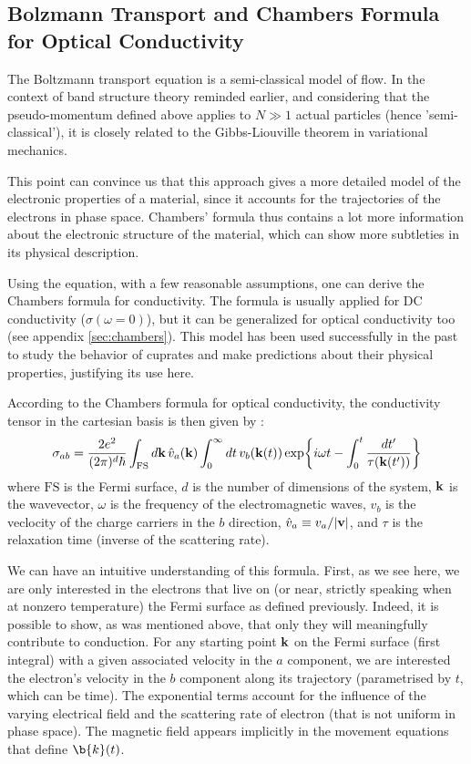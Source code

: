 \subsection{Bolzmann Transport and Chambers Formula for Optical Conductivity}
The Boltzmann transport equation is a semi-classical model of flow. 
In the context of band structure theory reminded earlier, 
and considering that the pseudo-momentum defined above applies to $N\gg 1$ actual particles (hence 'semi-classical'), 
it is closely related to the Gibbs-Liouville theorem in variational mechanics. 

This point can convince us that this approach gives a more detailed model of the electronic properties of a material, 
since it accounts for the trajectories of the electrons in phase space. 
Chambers' formula thus contains a lot more information about the electronic structure
of the material, 
which can show more subtleties in its physical description.

Using the equation, with a few reasonable assumptions, 
one can derive the Chambers formula for conductivity. 
The formula is usually applied for DC conductivity ($\sigma(\omega=0)$), 
but it can be generalized for optical conductivity too (see appendix \ref{sec:chambers}).
This model has been used successfully in the past to study the behavior of cuprates 
and make predictions about their physical properties\cite{grissonnanche2021}, 
justifying its use here.

According to the Chambers formula for optical conductivity, 
the conductivity tensor in the cartesian basis is then given by :
\begin{equation}
	\sigma_{ab} = \frac{2e^2}{(2\pi)^d\hbar}\int_{\mathrm{FS}}\dd{\vb{k}}\hat{v}_a(\vb{k})
        \int_0^{\infty}\dd{t}v_b(\vb{k}(t))\exp{i\omega t
        - \int_0^t \frac{\mathop{dt'}}{\tau(\vb{k}(t'))}}
\end{equation}
where $\mathrm{FS}$ is the Fermi surface, $d$ is the number of dimensions of the system, $\vb{k}$ is the
wavevector, $\omega$ is the frequency of the electromagnetic waves, $v_b$ is the veclocity of the
charge carriers in the $b$ direction, $\hat{v}_a\equiv v_a/\abs{\vb{v}}$, and $\tau$ is the
relaxation time (inverse of the scattering rate). 

We can have an intuitive understanding of this formula. 
First, as we see here, we are only interested in the electrons that live on (or near, strictly speaking when at nonzero temperature) the Fermi surface as defined previously. 
Indeed, it is possible to show, as was mentioned above, that only they will meaningfully contribute to conduction. 
For any starting point $\vb{k}$ on the Fermi surface (first integral) with a given associated velocity in the $a$ component, 
we are interested the electron's velocity in the $b$ component along its trajectory (parametrised by $t$,  which can be time). 
The exponential terms account for the influence of the varying electrical field and the scattering rate of electron (that is not uniform in phase space). 
The magnetic field appears implicitly in the movement equations that define $\b{k}(t)$.

